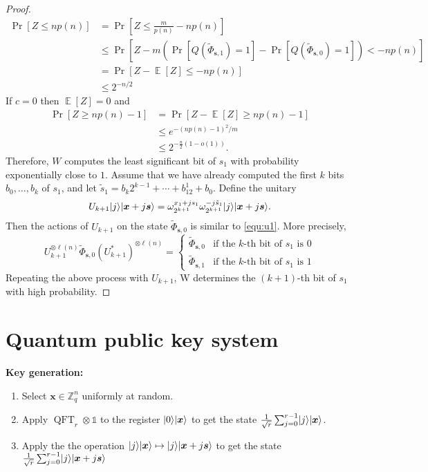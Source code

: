 \documentclass[11pt]{article}
\theoremstyle{plain}
\theoremstyle{definition}
\DeclareMathOperator{\qft}{QFT}
\DeclareMathOperator{\E}{\mathbb{E}}
\DeclarePairedDelimiter{\ldbrac}{\lvert}{\rangle}
\def\Z{\ensuremath{\mathbb{Z}}}
\begin{document}
\begin{proof}
    \begin{align*}
        \Pr[ Z \le np(n) ]
        & = \Pr[ Z \le \frac{m}{p(n)} - np(n) ] \\
        & \le \Pr[ Z - m(\Pr[ Q(\tilde{\Phi}_{\bm{s}, 1}) = 1 ] - \Pr[ Q(\tilde{\Phi}_{\bm{s}, 0}) = 1]) < -np(n) ] \\
        & = \Pr[ Z - \E[Z] \le -np(n) ] \\
        & \le 2^{-n / 2}
    \end{align*}
    If $c = 0$ then $\E[Z] = 0$ and
    \begin{align*}
        \Pr[ Z \ge np(n) - 1 ]
        & = \Pr[ Z -\E[Z] \ge np(n) - 1 ] \\
        & \le e^{-(np(n) - 1)^2 / m} \\
        & \le 2^{-\frac{n}{2}(1 - o(1))}.
    \end{align*}
    Therefore, $W$ computes the least significant bit of $s_1$ with probability exponentially close to $1$. Assume that we have already computed the first $k$ bits $b_0, \dots, b_k$ of $s_1$, and let $\tilde{s}_1 = b_k2^{k - 1} + \cdots + b_12^1 + b_0$. Define the unitary
    \[ U_{k + 1} \ldbrac{j}\ldbrac{\bm{x} + j\bm{s}} = \omega_{2^{k + 1}}^{x_1 + js_1} \omega_{2^{k + 1}}^{-j\tilde{s}_1} \ldbrac{j}\ldbrac{\bm{x} + j\bm{s}}. \]
    Then the actions of $U_{k + 1}$ on the state $\tilde{\Phi}_{\bm{s}, 0}$ is similar to \eqref{equ:u1}. More precisely,
    \[
    U_{k + 1}^{\otimes \ell(n)} \tilde{\Phi}_{\bm{s}, 0} (U_{k + 1}^*)^{\otimes \ell(n)} =
    \begin{cases}
        \tilde{\Phi}_{\bm{s}, 0} & \text{if the } k\text{-th bit of } s_1 \text{ is } 0 \\
        \tilde{\Phi}_{\bm{s}, 1} & \text{if the } k\text{-th bit of } s_1 \text{ is } 1
    \end{cases}
    \]
    Repeating the above process with $U_{k + 1}$, W determines the $(k + 1)$-th bit of $s_1$ with high probability.
\end{proof}






\section{Quantum public key system}


\textbf{Key generation:}
\begin{enumerate}[topsep = 1pt, itemsep = 1pt, parsep = 1pt]
\item Select $\bm{x} \in \Z_q^n$ uniformly at random.
\item Apply $\qft_r \otimes \mathds{1}$ to the register $\ldbrac{0} \ldbrac{\bm{x}}$ to get the state $\frac{1}{\sqrt{r}} \sum_{j = 0}^{r - 1} \ldbrac{j} \ldbrac{\bm{x}}$.
\item Apply the the operation $\ldbrac{j}\ldbrac{\bm{x}} \mapsto \ldbrac{j}\ldbrac{\bm{x} + j\bm{s}}$ to get the state $\frac{1}{\sqrt{r}} \sum_{j = 0}^{r - 1} \ldbrac{j} \ldbrac{\bm{x} + j\bm{s}}$
\end{enumerate}
\end{document}
